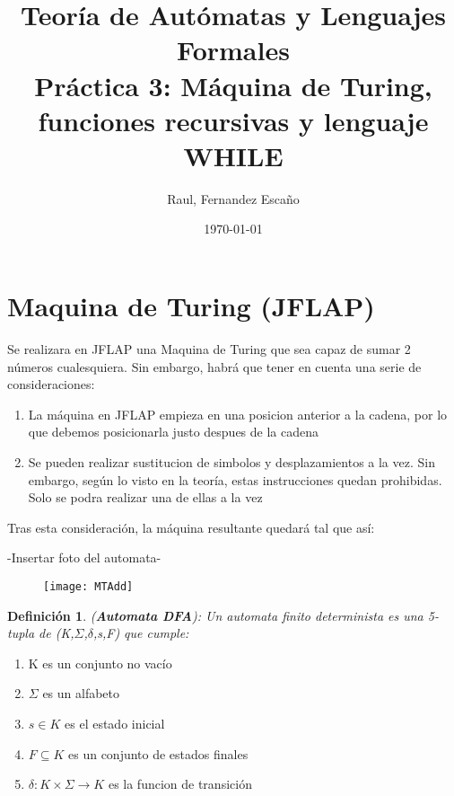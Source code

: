 \documentclass{article}
\title{Teoría de Autómatas y Lenguajes Formales\\[.4\baselineskip]Práctica 3: Máquina de Turing, funciones recursivas y lenguaje WHILE}
\author{Raul, Fernandez Escaño}
\date{\today}
\newtheorem{definicion}{Definición}[section]
\begin{document}

\maketitle

\section{Maquina de Turing (JFLAP)}
Se realizara en JFLAP una Maquina de Turing que sea capaz de sumar 2 números cualesquiera. Sin embargo, habrá que tener en cuenta una serie de consideraciones:
\begin{enumerate}
	\item La máquina en JFLAP empieza en una posicion anterior a la cadena, por lo que debemos posicionarla justo despues de la cadena
	\item Se pueden realizar sustitucion de simbolos y desplazamientos a la vez. Sin embargo, según lo visto en la teoría, estas instrucciones quedan prohibidas. Solo se podra realizar una de ellas a la vez
\end{enumerate}
Tras esta consideración, la máquina resultante quedará tal que así:

-Insertar foto del automata-
\begin{figure}
	\texttt{[image: MTAdd]}
\end{figure}

\begin{definicion}(\textbf{Automata DFA}): Un automata finito determinista es una 5-tupla de (K,$\Sigma$,$\delta$,s,F) que cumple:
\end{definicion}
	\begin{enumerate}[label=]
		\item K es un conjunto no vacío
		\item $\Sigma$ es un alfabeto
		\item $s\in K$ es el estado inicial
		\item $F \subseteq K$ es un conjunto de estados finales
		\item $\delta \colon K \times \Sigma \rightarrow K$ es la funcion
		de transición
	\end{enumerate}
\end{document}
